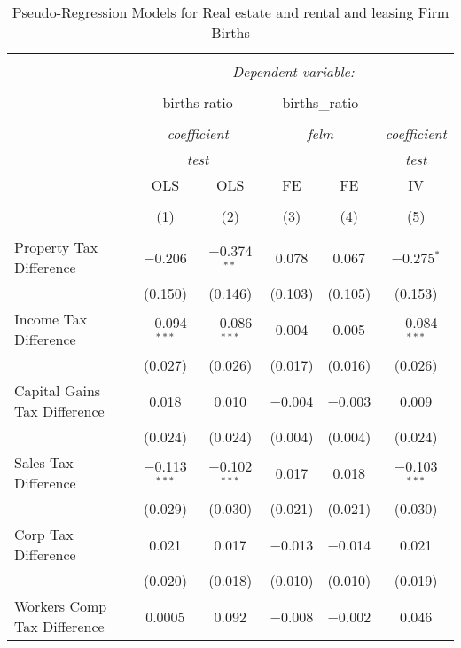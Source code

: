
\begin{table}[!htbp] \centering 
  \caption{Pseudo-Regression Models for  Real estate and rental and leasing Firm Births} 
  \label{} 
\begin{tabular}{@{\extracolsep{5pt}}lccccc} 
\\[-1.8ex]\hline 
\hline \\[-1.8ex] 
 & \multicolumn{5}{c}{\textit{Dependent variable:}} \\ 
\cline{2-6} 
\\[-1.8ex] & \multicolumn{2}{c}{births ratio} & \multicolumn{2}{c}{births\_ratio} &   \\ 
\\[-1.8ex] & \multicolumn{2}{c}{\textit{coefficient}} & \multicolumn{2}{c}{\textit{felm}} & \textit{coefficient} \\ 
 & \multicolumn{2}{c}{\textit{test}} & \multicolumn{2}{c}{\textit{}} & \textit{test} \\ 
 & OLS & OLS & FE & FE & IV \\ 
\\[-1.8ex] & (1) & (2) & (3) & (4) & (5)\\ 
\hline \\[-1.8ex] 
 Property Tax Difference & $-$0.206 & $-$0.374$^{**}$ & 0.078 & 0.067 & $-$0.275$^{*}$ \\ 
  & (0.150) & (0.146) & (0.103) & (0.105) & (0.153) \\ 
  Income Tax Difference & $-$0.094$^{***}$ & $-$0.086$^{***}$ & 0.004 & 0.005 & $-$0.084$^{***}$ \\ 
  & (0.027) & (0.026) & (0.017) & (0.016) & (0.026) \\ 
  Capital Gains Tax Difference & 0.018 & 0.010 & $-$0.004 & $-$0.003 & 0.009 \\ 
  & (0.024) & (0.024) & (0.004) & (0.004) & (0.024) \\ 
  Sales Tax Difference & $-$0.113$^{***}$ & $-$0.102$^{***}$ & 0.017 & 0.018 & $-$0.103$^{***}$ \\ 
  & (0.029) & (0.030) & (0.021) & (0.021) & (0.030) \\ 
  Corp Tax Difference & 0.021 & 0.017 & $-$0.013 & $-$0.014 & 0.021 \\ 
  & (0.020) & (0.018) & (0.010) & (0.010) & (0.019) \\ 
  Workers Comp Tax Difference & 0.0005 & 0.092 & $-$0.008 & $-$0.002 & 0.046 \\ 

\end{tabular}
\end{table}
